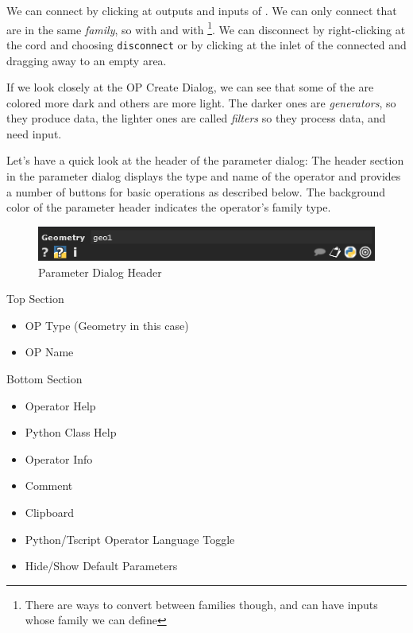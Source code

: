 We can connect \OPs by clicking at outputs and inputs of \OPs. We can only connect \OPs that are in the same \textit{family}, so \TOPs with \TOPs and \CHOPs with \CHOPs\footnote{There are ways to convert between families though, and \COMPs can have inputs whose family we can define}. We can disconnect \OPs by right-clicking at the cord and choosing \verb|disconnect| or by clicking at the inlet of the connected \OP and dragging away to an empty area.
\begin{framed}
	If we look closely at the OP Create Dialog, we can see that some of the \OPs are colored more dark and others are more light. The darker ones are \textit{generators}, so they produce data, the lighter ones are called \textit{filters} so they process data, and need input.

\end{framed}

Let's have a quick look at the header of the parameter dialog: The header section in the parameter dialog displays the type and name of the operator and provides a number of buttons for basic operations as described below. The background color of the parameter header indicates the operator's family type.

\begin{figure}[H]
	\begin{center}
		\includegraphics[width = 14cm]{img/ParameterHeader.png}
		\caption{Parameter Dialog Header}
		\label{fig:parHeader}
	\end{center}
\end{figure}




Top Section
\begin{itemize}
	\item OP Type (Geometry \COMP in this case)
	\item OP Name
\end{itemize}

Bottom Section
\begin{itemize}
	\item Operator Help
	\item Python Class Help
	\item Operator Info
	\item Comment
	\item Clipboard
	\item Python/Tscript Operator Language Toggle
	\item Hide/Show Default Parameters
\end{itemize}

